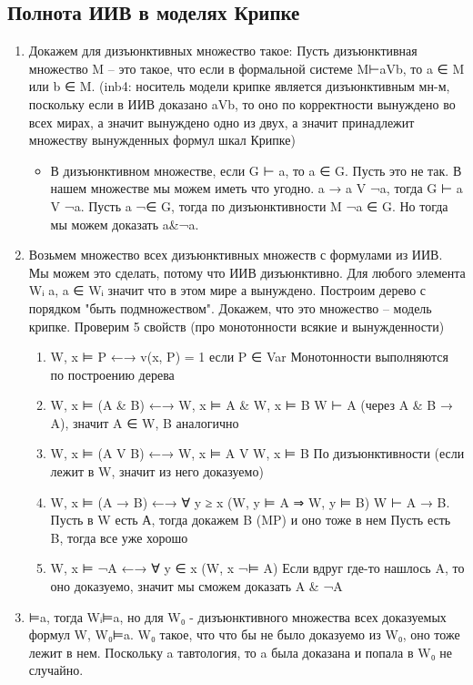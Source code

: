 \documentclass[11pt]{article}
\begin{document}
\subsection{Полнота ИИВ в моделях Крипке}
\label{sec-6-4}
\begin{enumerate}
\item Докажем для дизъюнктивных множество такое:
Пусть дизъюнктивная множество M – это такое, что если в
формальной системе M⊢aVb, то a ∈ M или b ∈ M.
(inb4: носитель модели крипке является дизъюнктивным мн-м, поскольку
если в ИИВ доказано aVb, то оно по корректности вынуждено во всех
мирах, а значит вынуждено одно из двух, а значит принадлежит множеству
вынужденных формул шкал Крипке)
\begin{itemize}
\item В дизъюнктивном множестве, если G ⊢ a, то a ∈ G.
Пусть это не так.
В нашем множестве мы можем иметь что угодно. a → a V ¬a,
тогда G ⊢ a V ¬a. Пусть a ¬∈ G, тогда по дизъюнктивности M ¬a ∈ G.
Но тогда мы можем доказать a\&¬a.
\end{itemize}
\item Возьмем множество всех дизъюнктивных множеств с формулами из ИИВ.
Мы можем это сделать, потому что ИИВ дизъюнктивно.
Для любого элемента Wᵢ a, a ∈ Wᵢ значит что в этом мире а вынуждено.
Построим дерево с порядком "быть подмножеством".
Докажем, что это множество – модель крипке.
Проверим 5 свойств (про монотонности всякие и вынужденности)
\begin{enumerate}
\item W, x ⊨ P ←→ v(x, P) = 1 если P ∈ Var
Монотонности выполняются по построению дерева
\item W, x ⊨ (A \& B) ←→ W, x ⊨ A \& W, x ⊨ B
W ⊢ A (через A \& B → A), значит A ∈ W, B аналогично
\item W, x ⊨ (A V B) ←→ W, x ⊨ A V W, x ⊨ B
По дизъюнктивности (если лежит в W, значит из него доказуемо)
\item W, x ⊨ (A → B) ←→ ∀ y ≥ x (W, y ⊨ A ⇒ W, y ⊨ B)
W ⊢ A → B. Пусть в W есть А, тогда докажем B (MP) и оно тоже в нем
Пусть есть B, тогда все уже хорошо
\item W, x ⊨ ¬A ←→ ∀ y ∈ x (W, x ¬⊨ A)
Если вдруг где-то нашлось A, то оно доказуемо, значит мы сможем
доказать A \& ¬A
\end{enumerate}
\item ⊨a, тогда Wᵢ⊨a, но для W₀ - дизъюнктивного множества всех доказуемых
формул W, W₀⊨a. W₀ такое, что что бы не было
доказуемо из W₀, оно тоже лежит в нем. Поскольку a тавтология, то
a была доказана и попала в W₀ не случайно.
\end{enumerate}
\end{document}
